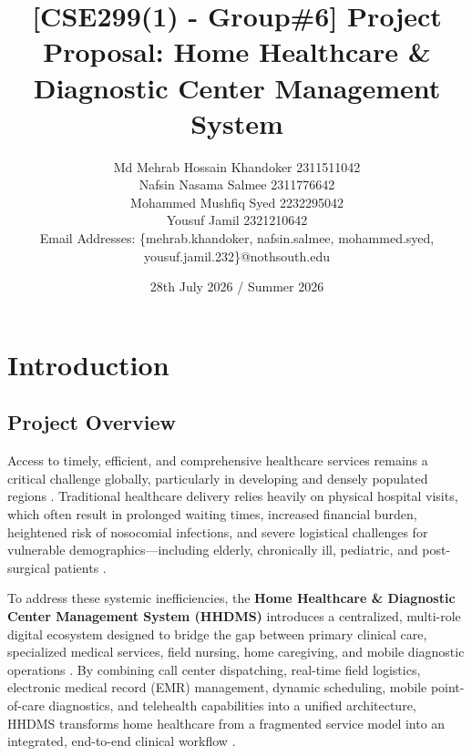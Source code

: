 \documentclass[lettersize,onecolumn,journal]{IEEEtran}
\begin{document}
	
	\title{[CSE299(1) - Group\#6] Project Proposal: Home Healthcare \& Diagnostic Center Management System}
	\date{28th July 2026 / Summer 2026}
	\author{Md Mehrab Hossain Khandoker 2311511042\\
		Nafsin Nasama Salmee 2311776642\\
		Mohammed Mushfiq Syed 2232295042\\
		Yousuf Jamil 2321210642\\
		Email Addresses: \{mehrab.khandoker, nafsin.salmee, mohammed.syed, yousuf.jamil.232\}@nothsouth.edu}
	\maketitle
	
	\section{Introduction}
	
	\subsection{Project Overview}
	Access to timely, efficient, and comprehensive healthcare services remains a critical challenge globally, particularly in developing and densely populated regions \cite{telemedicine_homecare}. Traditional healthcare delivery relies heavily on physical hospital visits, which often result in prolonged waiting times, increased financial burden, heightened risk of nosocomial infections, and severe logistical challenges for vulnerable demographics—including elderly, chronically ill, pediatric, and post-surgical patients \cite{telemedicine_homecare}.
	
	To address these systemic inefficiencies, the \textbf{Home Healthcare \& Diagnostic Center Management System (HHDMS)} introduces a centralized, multi-role digital ecosystem designed to bridge the gap between primary clinical care, specialized medical services, field nursing, home caregiving, and mobile diagnostic operations \cite{srs2026}. By combining call center dispatching, real-time field logistics, electronic medical record (EMR) management, dynamic scheduling, mobile point-of-care diagnostics, and telehealth capabilities into a unified architecture, HHDMS transforms home healthcare from a fragmented service model into an integrated, end-to-end clinical workflow \cite{srs2026}.
	
\end{document}
